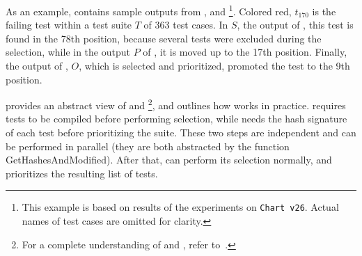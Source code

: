As an example,  contains sample outputs from \ek, \fs and \fz\footnote{This example is based on results of the experiments on \texttt{Chart v26}. Actual names of test cases are omitted for clarity.}.
Colored red, $t_{170}$ is the failing test within a test suite $T$ of 363 test cases.
In $S$, the output of \ek, this test is found in the 78th position, because several tests were excluded during the selection, while in the output $P$ of \fs, it is moved up to the 17th position.
Finally, the output of \fz, $O$, which is selected and prioritized, promoted the test to the 9th position.

 provides an abstract view of \ek and \fs\footnote{For a complete understanding of \ek and \fs, refer to~\cite{gligoricEk,miranda_fast_2018}.}, and outlines how \fz works in practice.
\ek requires tests to be compiled before performing selection, while \fs needs the hash signature of each test before prioritizing the suite.
These two steps are independent and can be performed in parallel (they are both abstracted by the function GetHashesAndModified).
After that, \ek can perform its selection normally, and \fs prioritizes the resulting list of tests.





